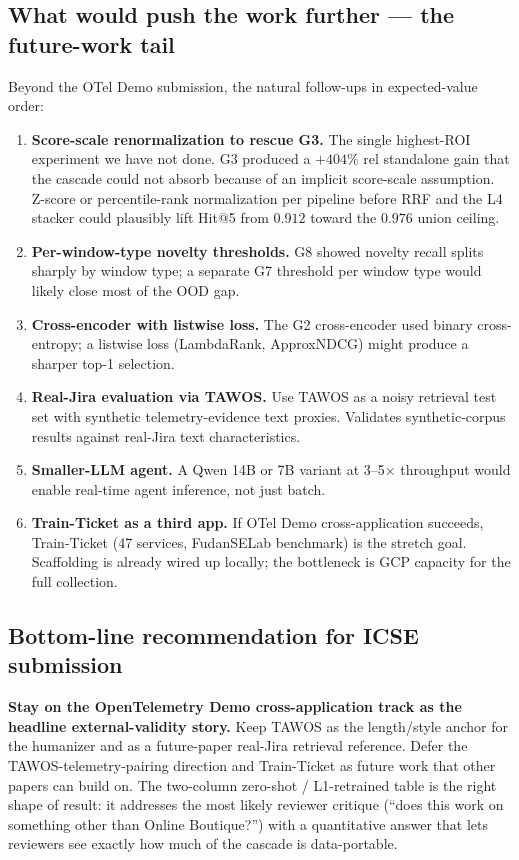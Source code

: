 \subsection{What would push the work further --- the future-work tail}

Beyond the OTel Demo submission, the natural follow-ups in expected-value order:

\begin{enumerate}
\item \textbf{Score-scale renormalization to rescue G3.} The single highest-ROI experiment we have not done. G3 produced a $+404\%$ rel standalone gain that the cascade could not absorb because of an implicit score-scale assumption. Z-score or percentile-rank normalization per pipeline before RRF and the L4 stacker could plausibly lift Hit@5 from $0.912$ toward the $0.976$ union ceiling.
\item \textbf{Per-window-type novelty thresholds.} G8 showed novelty recall splits sharply by window type; a separate G7 threshold per window type would likely close most of the OOD gap.
\item \textbf{Cross-encoder with listwise loss.} The G2 cross-encoder used binary cross-entropy; a listwise loss (LambdaRank, ApproxNDCG) might produce a sharper top-1 selection.
\item \textbf{Real-Jira evaluation via TAWOS.} Use TAWOS as a noisy retrieval test set with synthetic telemetry-evidence text proxies. Validates synthetic-corpus results against real-Jira text characteristics.
\item \textbf{Smaller-LLM agent.} A Qwen 14B or 7B variant at 3--5$\times$ throughput would enable real-time agent inference, not just batch.
\item \textbf{Train-Ticket as a third app.} If OTel Demo cross-application succeeds, Train-Ticket (47 services, FudanSELab benchmark) is the stretch goal. Scaffolding is already wired up locally; the bottleneck is GCP capacity for the full collection.
\end{enumerate}

\subsection{Bottom-line recommendation for ICSE submission}

\textbf{Stay on the OpenTelemetry Demo cross-application track as the headline external-validity story.} Keep TAWOS as the length/style anchor for the humanizer and as a future-paper real-Jira retrieval reference. Defer the TAWOS-telemetry-pairing direction and Train-Ticket as future work that other papers can build on. The two-column zero-shot / L1-retrained table is the right shape of result: it addresses the most likely reviewer critique (``does this work on something other than Online Boutique?'') with a quantitative answer that lets reviewers see exactly how much of the cascade is data-portable.
